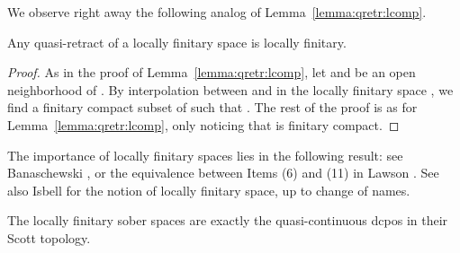 \documentclass{LMCS}
\begin{document}
We observe right away the following analog of
Lemma~\ref{lemma:qretr:lcomp}.
\begin{lem}
  \label{lemma:qretr:lfin}
  Any quasi-retract  of a locally finitary space  is locally
  finitary.
\end{lem}
\begin{proof}
  As in the proof of Lemma~\ref{lemma:qretr:lcomp}, let  and
   be an open neighborhood of .  By interpolation between  and  in the locally finitary space , we
  find a finitary compact subset  of  such that
  .  The rest of the proof is as for
  Lemma~\ref{lemma:qretr:lcomp}, only noticing that  is finitary compact.
\end{proof}
The importance of locally finitary spaces lies in the following
result: see Banaschewski \cite{Banaschewski:essn:ext}, or the
equivalence between Items (6) and (11) in Lawson
\cite[Theorem~2]{Lawson:T0:pw:conv}.  See also Isbell
\cite{Isbell:meetcont} for the notion of locally finitary space, up to
change of names.
\begin{prop}
  \label{prop:locfin=qcont}
  The locally finitary sober spaces are exactly the quasi-continuous dcpos in their Scott
  topology.
\end{prop}
\end{document}
